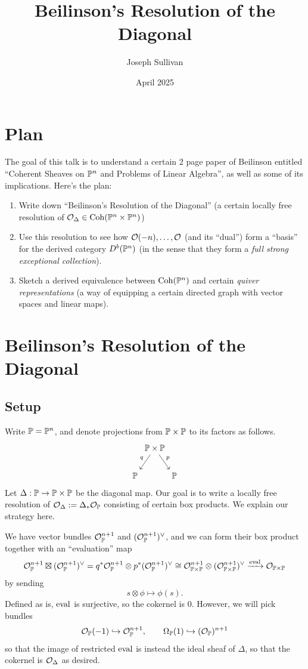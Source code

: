\documentclass[12pt]{article}
\title{Beilinson's Resolution of the Diagonal}
\author{Joseph Sullivan}
\date{April 2025}
\begin{document}
\maketitle
\tableofcontents

\section*{Plan}

The goal of this talk is to understand a certain 2 page paper of Beilinson entitled ``Coherent Sheaves on $\P^n$ and Problems of Linear Algebra'', as well as some of its implications. Here's the plan:
\begin{enumerate}
    \item Write down ``Beilinson's Resolution of the Diagonal'' (a certain locally free resolution of $\cO_{\Delta} \in \Coh(\P^n\times \P^n)$)
    \item Use this resolution to see how $\cO(-n),\dots,\cO$ (and its ``dual'') form a ``basis'' for the derived category $D^b(\P^n)$ (in the sense that they form a \textit{full strong exceptional collection}).
    \item Sketch a derived equivalence between $\Coh(\P^n)$ and certain \textit{quiver representations} (a way of equipping a certain directed graph with vector spaces and linear maps).
\end{enumerate}
\newpage


\section{Beilinson's Resolution of the Diagonal}

\subsection{Setup}
Write $\P=\P^n$, and denote projections from $\P\times \P$ to its factors as follows.
\[\begin{tikzcd}[column sep=0cm]
    & \P\times \P \ar[dl,"q"'] \ar[dr,"p"] &\\
    \P & & \P
\end{tikzcd}\]
Let $\Delta: \P \to \P\times \P$ be the diagonal map. Our goal is to write a locally free resolution of $\cO_\Delta \defeq \Delta_* \cO_\P$ consisting of certain box products. We explain our strategy here.

We have vector bundles $\cO_\P^{n+1}$ and $(\cO_\P^{n+1})^\vee$, and we can form their box product together with an ``evaluation'' map
\[\cO_\P^{n+1} \boxtimes (\cO_\P^{n+1})^\vee = q^* \cO_\P^{n+1} \otimes p^* (\cO_\P^{n+1})^\vee \cong \cO_{\P\times\P}^{n+1} \otimes (\cO_{\P\times\P}^{n+1})^\vee \xrightarrow{\eval} \cO_{\P\times \P}\]
by sending
\[s \otimes \phi \longmapsto \phi(s).\]
Defined as is, $\eval$ is surjective, so the cokernel is 0. However, we will pick bundles
\[\cO_\P(-1) \hookrightarrow \cO_\P^{n+1}, \qquad \Omega_\P(1) \hookrightarrow (\cO_\P)^{n+1}\]
so that the image of restricted $\eval$ is instead the ideal sheaf of $\Delta$, so that the cokernel is $\cO_{\Delta}$ as desired.
\end{document}
